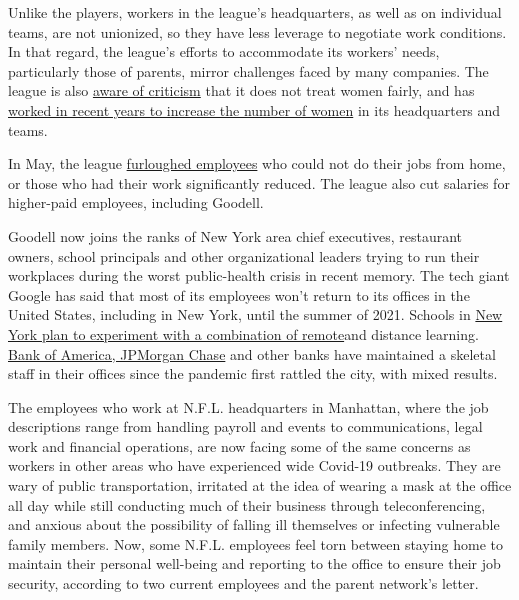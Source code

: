 Unlike the players, workers in the league's headquarters, as well as on
individual teams, are not unionized, so they have less leverage to
negotiate work conditions. In that regard, the league's efforts to
accommodate its workers' needs, particularly those of parents, mirror
challenges faced by many companies. The league is also
\href{https://www.nytimes3xbfgragh.onion/2020/07/17/sports/football/sexual-harassment-washington-dan-snyder.html}{aware
of criticism} that it does not treat women fairly, and has
\href{https://www.nfl.com/news/op-ed-nfl-works-hard-to-promote-women-to-leadership-roles}{worked
in recent years to increase the number of women} in its headquarters and
teams.

In May, the league
\href{https://www.cnbc.com/2020/04/29/the-nfl-is-furloughing-league-employees-and-reducing-salaries-due-to-coronavirus.html}{furloughed
employees} who could not do their jobs from home, or those who had their
work significantly reduced. The league also cut salaries for higher-paid
employees, including Goodell.

Goodell now joins the ranks of New York area chief executives,
restaurant owners, school principals and other organizational leaders
trying to run their workplaces during the worst public-health crisis in
recent memory. The tech giant Google has said that most of its employees
won't return to its offices in the United States, including in New York,
until the summer of 2021. Schools in
\href{https://www.nytimes3xbfgragh.onion/2020/07/06/nyregion/nyc-school-reopening-plan.html?searchResultPosition=6}{New
York plan to experiment with a combination of remote}and distance
learning.
\href{https://www.nytimes3xbfgragh.onion/2020/04/09/business/coronvirus-bank-of-america-workers.html}{Bank
of America, JPMorgan Chase} and other banks have maintained a skeletal
staff in their offices since the pandemic first rattled the city, with
mixed results.

The employees who work at N.F.L. headquarters in Manhattan, where the
job descriptions range from handling payroll and events to
communications, legal work and financial operations, are now facing some
of the same concerns as workers in other areas who have experienced wide
Covid-19 outbreaks. They are wary of public transportation, irritated at
the idea of wearing a mask at the office all day while still conducting
much of their business through teleconferencing, and anxious about the
possibility of falling ill themselves or infecting vulnerable family
members. Now, some N.F.L. employees feel torn between staying home to
maintain their personal well-being and reporting to the office to ensure
their job security, according to two current employees and the parent
network's letter.

